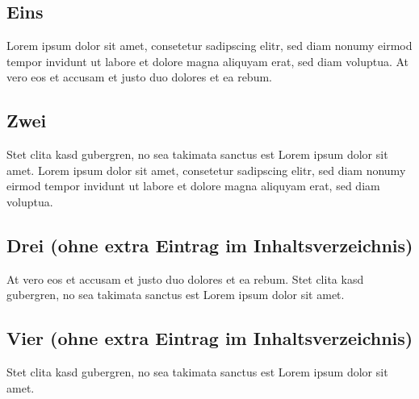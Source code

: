 \chapter{\appendixname}

\section{Eins}
Lorem ipsum dolor sit amet, consetetur sadipscing elitr, sed diam nonumy eirmod tempor invidunt ut labore et dolore magna aliquyam erat, sed diam voluptua. At vero eos et accusam et justo duo dolores et ea rebum.

\section{Zwei}
Stet clita kasd gubergren, no sea takimata sanctus est Lorem ipsum dolor sit amet. Lorem ipsum dolor sit amet, consetetur sadipscing elitr, sed diam nonumy eirmod tempor invidunt ut labore et dolore magna aliquyam erat, sed diam voluptua.

\section*{Drei (ohne extra Eintrag im Inhaltsverzeichnis)}
At vero eos et accusam et justo duo dolores et ea rebum. Stet clita kasd gubergren, no sea takimata sanctus est Lorem ipsum dolor sit amet.

\section*{Vier (ohne extra Eintrag im Inhaltsverzeichnis)}
Stet clita kasd gubergren, no sea takimata sanctus est Lorem ipsum dolor sit amet.